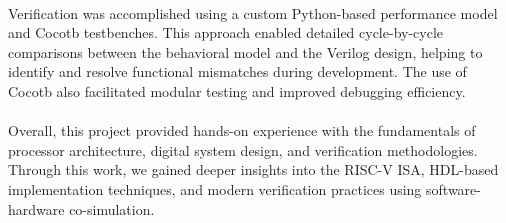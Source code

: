 \documentclass[12pt]{report}
\begin{document}
\paragraph{}
Verification was accomplished using a custom Python-based performance model and Cocotb testbenches. This approach enabled detailed cycle-by-cycle comparisons between the behavioral model and the Verilog design, helping to identify and resolve functional mismatches during development. The use of Cocotb also facilitated modular testing and improved debugging efficiency.

\paragraph{}
Overall, this project provided hands-on experience with the fundamentals of processor architecture, digital system design, and verification methodologies. Through this work, we gained deeper insights into the RISC-V ISA, HDL-based implementation techniques, and modern verification practices using software-hardware co-simulation.

\printbibliography
\end{document}
